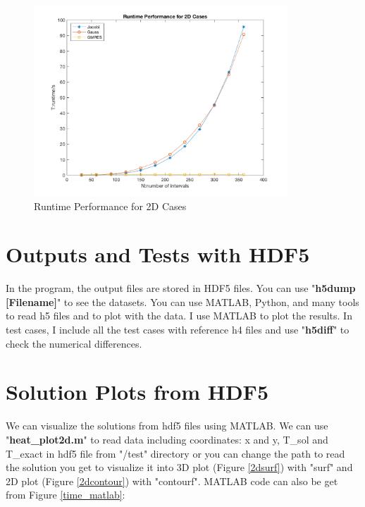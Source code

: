 \documentclass[a4paper]{article}
\begin{document}
\begin{figure}[htbp]
\centering
\includegraphics[width=0.85\textwidth]{2D_time.png}
\caption{\label{2dtime}Runtime Performance for 2D Cases}
\end{figure}


\section{Outputs and Tests with HDF5}
In the program, the output files are stored in HDF5 files. You can use "\textbf{h5dump [Filename]}" to see the datasets. You can use MATLAB, Python, and many tools to read h5 files and to plot with the data. I use MATLAB to plot the results. In test cases, I include all the test cases with reference h4 files and use "\textbf{h5diff}" to check the numerical differences.

\section{Solution Plots from HDF5}

We can visualize the solutions from hdf5 files using MATLAB. We can use "\textbf{heat\_plot2d.m}" to read data including coordinates: x and y, T\_sol and T\_exact in hdf5 file from "/test" directory or you can change the path to read the solution you get to visualize it into 3D plot (Figure \ref{2dsurf}) with "surf" and 2D plot (Figure \ref{2dcontour}) with "contourf". MATLAB code can also be get from Figure \ref{time_matlab}:
\end{document}
